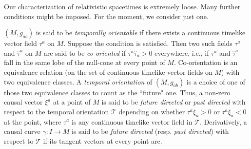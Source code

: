 \documentclass [12] {article}
\theoremstyle{plain}
\numberwithin{figure}{subsection}
\numberwithin{proposition}{subsection}
\begin{document}
Our characterization of relativistic spacetimes is extremely loose.  Many further conditions might be imposed. For  the moment, we consider just one.  

$(M, g_{ab})$ is said to be \emph{temporally orientable} if there exists a continuous timelike vector field $\tau^a$ on $M$.  Suppose the condition is satisfied. Then two such fields $\tau^a$ and $\hat{\tau}^a$ on $M$  are said to be \emph{co-oriented} if $\tau^a \hat{\tau}_a > 0$ everywhere, i.e., if $\tau^a$ and $\hat{\tau}^a$ fall in the same lobe of the null-cone at every point of $M$.  Co-orientation is an equivalence relation (on the set of continuous timelike vector fields on $M$) with two equivalence classes.  A \emph{temporal orientation} of $(M, g_{ab})$ is a choice of one of those two equivalence classes to count as the ``future" one. Thus, a non-zero causal  vector  $\xi^a$ at a point of $M$ is said to be \emph{future directed} or \emph{past directed} with respect to the temporal orientation $\mathcal{T}$ depending on whether  $\tau^a \xi_a > 0$ or $\tau^a \xi_a < 0$ at the point,  where $\tau^a$ is any continuous timelike vector field in $\mathcal{T}$. Derivatively, a causal curve  $\gamma \! \! : I \rightarrow M$ is said to be \emph{future directed} (resp.  \emph{past directed}) with respect to $\mathcal{T}$ if its tangent vectors at every point are. 

\end{document}
